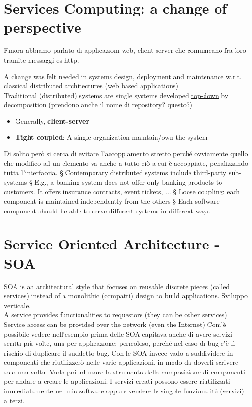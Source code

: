 \section{Services Computing: a change of perspective}
Finora abbiamo parlato di applicazioni web, client-server che comunicano fra loro tramite messaggi es http.

A change was felt needed in systems design, deployment and maintenance w.r.t. classical distributed
architectures (web based applications)
\\Traditional (distributed) systems are single systems developed \underline{top-down} by decomposition (prendono anche il nome di repository? questo?)
\begin{itemize}
    \item Generally, \textbf{client-server}
    \item \textbf{Tight coupled}: A single organization maintain/own the system
\end{itemize}
Di solito però si cerca di evitare l'accoppiamento stretto perché ovviamente quello che modifico ad un elemento va anche a tutto ciò a cui è accoppiato, penalizzando tutta l'interfaccia.
§ Contemporary distributed systems include third-party sub-systems
§ E.g., a banking system does not offer only banking products to customers. It offers insurance contracts, event tickets, ...
§ Loose coupling: each component is maintained independently from the others
§ Each software component should be able to serve different systems in different ways

\section{Service Oriented Architecture - SOA}
SOA is an architectural style that focuses on reusable discrete pieces (called services) instead of a monolithic (compatti) design to build applications. Sviluppo verticale.
\\A service provides functionalities to requestors (they can be other services)
\\Service access can be provided over the network (even the Internet)
Com'è possibile vedere nell'esempio prima delle SOA capitava anche di avere servizi scritti più volte, una per applicazione: pericoloso, perché nel caso di bug c'è il rischio di duplicare il suddetto bug.
Con le SOA invece vado a suddividere in componenti che riutilizzerò nelle varie applicazioni, in modo da doverli scrivere solo una volta. Vado poi ad usare lo strumento della composizione di componenti per andare a creare le applicazioni. I servizi creati possono essere riutilizzati immediatamente nel mio software oppure vendere le singole funzionalità (servizi) a terzi.

